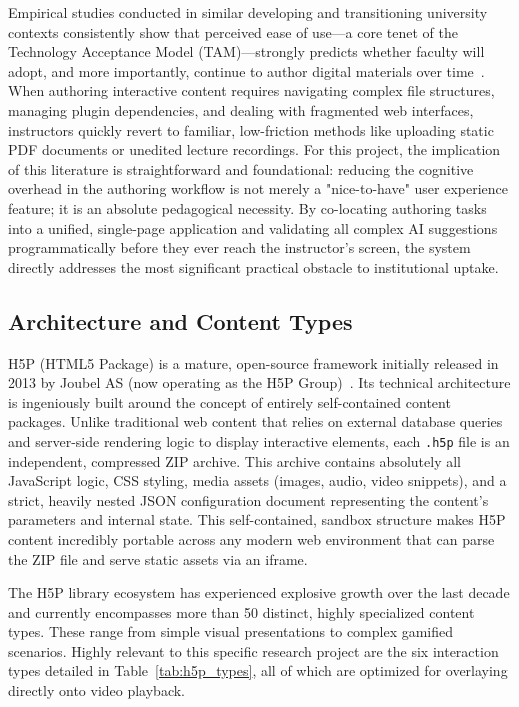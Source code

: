 Empirical studies conducted in similar developing and transitioning university contexts consistently show that perceived ease of use—a core tenet of the Technology Acceptance Model (TAM)—strongly predicts whether faculty will adopt, and more importantly, continue to author digital materials over time~\cite{davis1989,hadullo2017,garrison2008}. When authoring interactive content requires navigating complex file structures, managing plugin dependencies, and dealing with fragmented web interfaces, instructors quickly revert to familiar, low-friction methods like uploading static PDF documents or unedited lecture recordings. For this project, the implication of this literature is straightforward and foundational: reducing the cognitive overhead in the authoring workflow is not merely a "nice-to-have" user experience feature; it is an absolute pedagogical necessity. By co-locating authoring tasks into a unified, single-page application and validating all complex AI suggestions programmatically before they ever reach the instructor's screen, the system directly addresses the most significant practical obstacle to institutional uptake.

\subsection{Architecture and Content Types}

H5P (HTML5 Package) is a mature, open-source framework initially released in 2013 by Joubel AS (now operating as the H5P Group)~\cite{h5p2023}. Its technical architecture is ingeniously built around the concept of entirely self-contained content packages. Unlike traditional web content that relies on external database queries and server-side rendering logic to display interactive elements, each \texttt{.h5p} file is an independent, compressed ZIP archive. This archive contains absolutely all JavaScript logic, CSS styling, media assets (images, audio, video snippets), and a strict, heavily nested JSON configuration document representing the content's parameters and internal state. This self-contained, sandbox structure makes H5P content incredibly portable across any modern web environment that can parse the ZIP file and serve static assets via an iframe.

The H5P library ecosystem has experienced explosive growth over the last decade and currently encompasses more than 50 distinct, highly specialized content types. These range from simple visual presentations to complex gamified scenarios. Highly relevant to this specific research project are the six interaction types detailed in Table~\ref{tab:h5p_types}, all of which are optimized for overlaying directly onto video playback.

